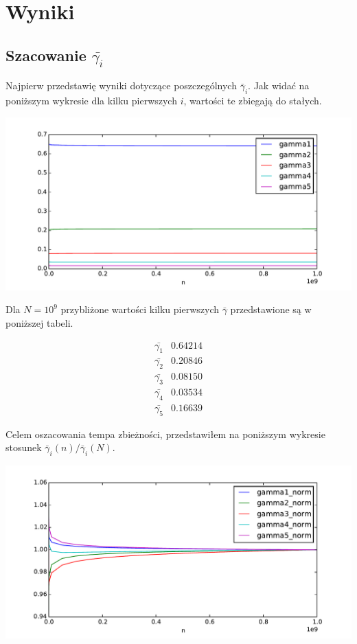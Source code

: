 \documentclass{report}
\begin{document}
\chapter*{Wyniki}

\section*{Szacowanie $\bar{\gamma_i}$}

Najpierw przedstawię wyniki dotyczące poszczególnych $\bar{\gamma}_i$. Jak widać na poniższym wykresie dla kilku pierwszych $i$, wartości te zbiegają do stałych.

\begin{center} \includegraphics[width=0.75 \linewidth]{0} \end{center}

Dla $N=10^9$ przybliżone wartości kilku pierwszych $\bar{\gamma}$ przedstawione są w poniższej tabeli.

$$
\begin{array}{cc}
    \bar{\gamma_1} & 0.64214 \\
    \bar{\gamma_2} & 0.20846 \\
    \bar{\gamma_3} & 0.08150 \\
    \bar{\gamma_4} & 0.03534 \\
    \bar{\gamma_5} & 0.16639
\end{array}
$$

Celem oszacowania tempa zbieżności, przedstawiłem na poniższym wykresie stosunek $\bar{\gamma}_i(n) / \bar{\gamma}_i(N)$.

\begin{center} \includegraphics[width=0.75 \linewidth]{1} \end{center}
\end{document}
